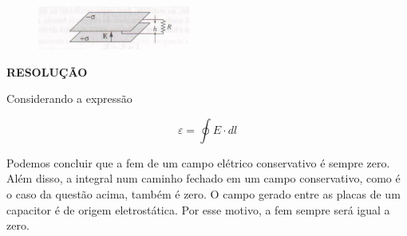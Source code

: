 \documentclass[11pt,a4paper]{article}
\begin{document}
\begin{enumerate}
\begin{figure}[h]	
\centering %
\includegraphics[width=5cm]{Selection_094.jpg} 
\end{figure}



\textbf{RESOLUÇÃO}

Considerando a expressão

$$\varepsilon = \displaystyle\oint E \cdot dl$$

Podemos concluir que a fem de um campo elétrico conservativo é sempre zero. Além disso, a integral num caminho fechado em um campo conservativo, como é o caso da questão acima, também é zero. O campo gerado entre as placas de um capacitor é de origem eletrostática. Por esse motivo, a fem sempre será igual a zero.



\end{enumerate}
	
\end{document}
